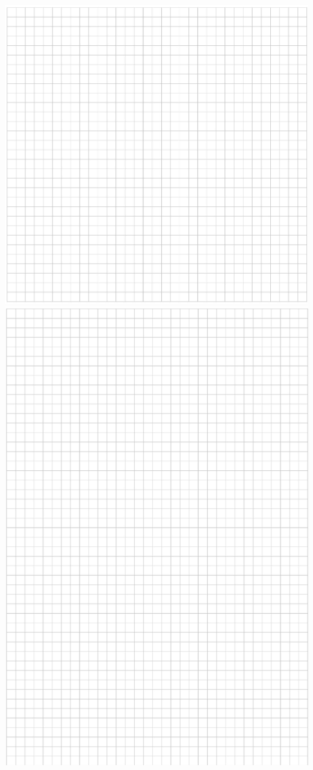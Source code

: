 \documentclass[10pt]{article}
\begin{document}
\includegraphics[max width=\textwidth, center]{2024_11_21_8bf32a7596bd08ca7a9fg-14(1)}\\
\includegraphics[max width=\textwidth, center]{2024_11_21_8bf32a7596bd08ca7a9fg-15}
\end{document}
